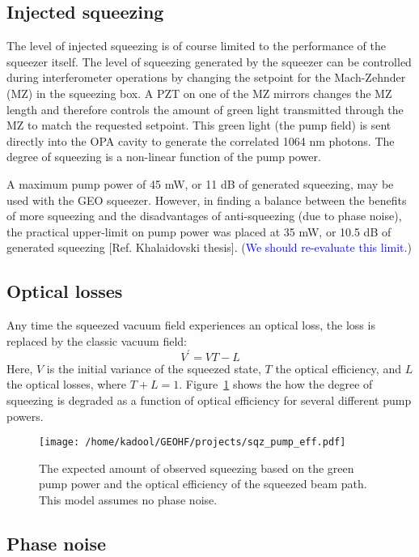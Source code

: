 \documentclass{ligodoc}
\begin{document}
\subsection{Injected squeezing}
The level of injected squeezing is of course limited to the
performance of the squeezer itself. The level of squeezing generated
by the squeezer can be controlled during interferometer operations by
changing the setpoint for the Mach-Zehnder (MZ) in the squeezing
box. A PZT on one of the MZ mirrors changes the MZ length and
therefore controls the amount of green light transmitted through the
MZ to match the requested setpoint. This green light (the pump field)
is sent directly into the OPA cavity to generate the correlated 1064
nm photons. The degree of squeezing is a non-linear function of the
pump power.

A maximum pump power of 45 mW, or 11 dB of generated squeezing, may be
used with the GEO squeezer. However, in finding a balance between the
benefits of more squeezing and the disadvantages of anti-squeezing
(due to phase noise), the practical upper-limit on pump power was
placed at 35 mW, or 10.5 dB of generated squeezing [Ref. Khalaidovski
  thesis]. (\textcolor{blue}{We should re-evaluate this limit.})


\subsection{Optical losses}
Any time the squeezed vacuum field experiences an optical loss, the
loss is replaced by the classic vacuum field:
\begin{equation}
V^\prime= VT - L
\end{equation}
Here, $V$ is the initial variance of the squeezed state, $T$ the optical
efficiency, and $L$ the optical losses, where
$T+L=1$. Figure~\ref{fig:sqzpumplosses} shows the how the degree of
squeezing is degraded as a function of optical efficiency for several
different pump powers.

\begin{figure}
\begin{centering}
\texttt{[image: /home/kadool/GEOHF/projects/sqz\_pump\_eff.pdf]}
\caption{The expected amount of observed squeezing based on the green
  pump power and the optical efficiency of the squeezed beam path. This
  model assumes no phase noise.}
\label{fig:sqzpumplosses}
\end{centering}
\end{figure}


\subsection{Phase noise}
\end{document}
